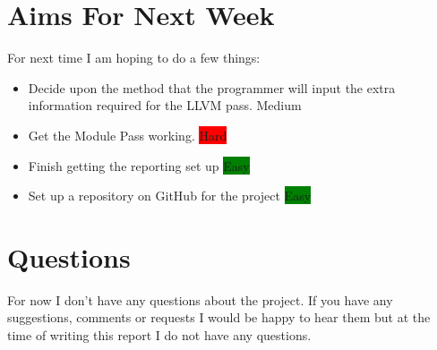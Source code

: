 \documentclass{article}
\begin{document}
\section*{Aims For Next Week}
For next time I am hoping to do a few things:
\begin{itemize}
	\item Decide upon the method that the programmer will input the extra information required for the LLVM pass. \colorbox{BurntOrange}{\color{Black}Medium}
	\item Get the Module Pass working. \colorbox{Red}{\color{Black}Hard}
	\item Finish getting the reporting set up \colorbox{Green}{\color{Black}Easy}
	\item Set up a repository on GitHub for the project \colorbox{Green}{\color{Black}Easy}
\end{itemize} 

\section*{Questions}
For now I don't have any questions about the project. If you have any suggestions, comments or requests I would be happy to hear them but at the time of writing this report I do not have any questions.

\medskip
 
\printbibliography
\end{document}
